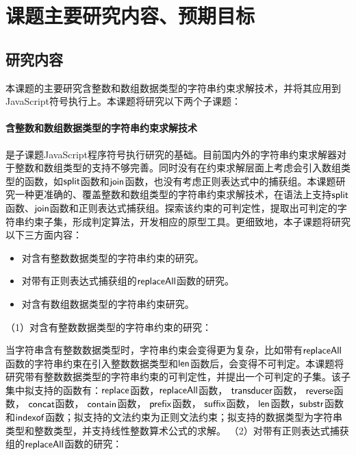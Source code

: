\section{课题主要研究内容、预期目标}
\subsection{研究内容}
本课题的主要研究含整数和数组数据类型的字符串约束求解技术，并将其应用到JavaScript符号执行上。本课题将研究以下两个子课题：
\paragraph{含整数和数组数据类型的字符串约束求解技术}
是子课题JavaScript程序符号执行研究的基础。目前国内外的字符串约束求解器对于整数和数组类型的支持不够完善。同时没有在约束求解层面上考虑会引入数组类型的函数，如$\mathsf{split}$函数和$\mathsf{join}$函数，也没有考虑正则表达式中的捕获组。本课题研究一种更准确的、覆盖整数和数组类型的字符串约束求解技术，在语法上支持$\mathsf{split}$函数、$\mathsf{join}$函数和正则表达式捕获组。探索该约束的可判定性，提取出可判定的字符串约束子集，形成判定算法，开发相应的原型工具。更细致地，本子课题将研究以下三方面内容：
\begin{itemize}
    \item 对含有整数数据类型的字符串约束的研究。
    \item 对带有正则表达式捕获组的$\mathsf{replaceAll}$函数的研究。
    \item 对含有数组数据类型的字符串约束研究。
\end{itemize}
（1）对含有整数数据类型的字符串约束的研究：

当字符串含有整数数据类型时，字符串约束会变得更为复杂，比如带有$\mathsf{replaceAll}$函数的字符串约束在引入整数数据类型和$\mathsf{len}$函数后，会变得不可判定\cite{repalceall_decidable}。本课题将研究带有整数数据类型的字符串约束的可判定性，并提出一个可判定的子集。该子集中拟支持的函数有：$\mathsf{replace}$函数，$\mathsf{replaceAll}$函数， $\mathsf{transducer}$函数， $\mathsf{reverse}$函数， $\mathsf{concat}$函数， $\mathsf{contain}$函数， $\mathsf{prefix}$函数， $\mathsf{suffix}$函数， $\mathsf{len}$函数，$\mathsf{substr}$函数和$\mathsf{indexof}$函数；拟支持的文法约束为正则文法约束；拟支持的数据类型为字符串类型和整数类型，并支持线性整数算术公式的求解。\newline
（2）对带有正则表达式捕获组的$\mathsf{replaceAll}$函数的研究：

